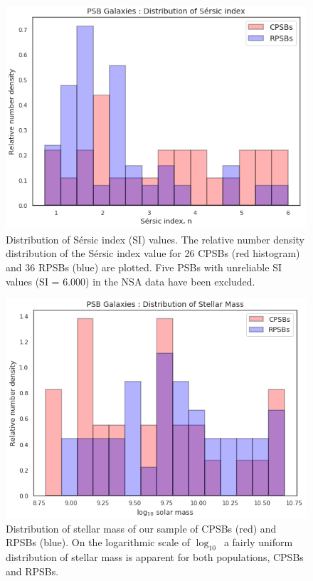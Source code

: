 \begin{figure}
    \centering
    \includegraphics[width=\columnwidth]{images/JupyterPlots/Dist-Sersic-Index-All.png}
    \caption[Comparison of the distribution of S\'ersic index values of CPSBs and RPSBs]{Distribution of S\'ersic index (SI) values. The relative number density distribution of the S\'ersic index value for 26 CPSBs (red histogram) and 36 RPSBs (blue) are plotted. Five PSBs with unreliable SI values (SI = 6.000) in the NSA data  have been excluded.}
    \label{fig:Sersic-plot}
\end{figure}

\begin{figure}
    \centering
    \includegraphics[width=\columnwidth]{images/JupyterPlots/Dist-Stellar-Mass-All.png}
    \caption[Distribution of stellar mass for CPSBs and RPSBs]{Distribution of stellar mass of our sample of CPSBs (red) and RPSBs (blue). On the logarithmic scale of $\log_{10}$\Msun\ a fairly uniform distribution of stellar mass is apparent for both populations, CPSBs and RPSBs.}
    \label{fig:stellar-mass-plot}
\end{figure}

